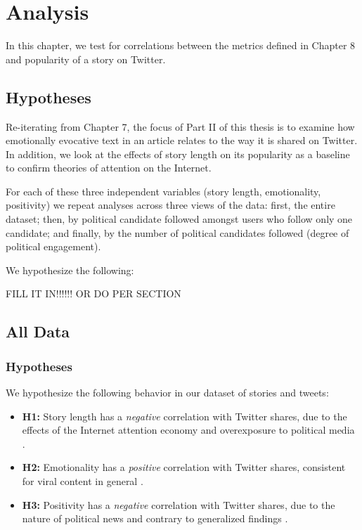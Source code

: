 
\chapter{Analysis}
In this chapter, we test for correlations between the metrics defined in Chapter 8 and popularity of a story on Twitter.

\section{Hypotheses}
Re-iterating from Chapter 7, the focus of Part II of this thesis is to examine how emotionally evocative text in an article relates to the way it is shared on Twitter. In addition, we look at the effects of story length on its popularity as a baseline to confirm theories of attention on the Internet.

For each of these three independent variables (story length, emotionality, positivity) we repeat analyses across three views of the data: first, the entire dataset; then, by political candidate followed amongst users who follow only one candidate; and finally, by the number of political candidates followed (degree of political engagement).

We hypothesize the following:

 FILL IT IN!!!!!! OR DO PER SECTION


\section{All Data}
\subsection{Hypotheses}
We hypothesize the following behavior in our dataset of stories and tweets:

\begin{itemize} 
    \item \textbf{H1:} Story length has a \emph{negative} correlation with Twitter shares, due to the effects of the Internet attention economy and overexposure to political media \cite{goldhaber1997attention}.
    \item \textbf{H2:} Emotionality has a \emph{positive} correlation with Twitter shares, consistent for viral content in general \cite{berger2012makes}.
    \item \textbf{H3:} Positivity has a \emph{negative} correlation with Twitter shares, due to the nature of political news and contrary to generalized findings \cite{berger2012makes}.

\end{itemize}

